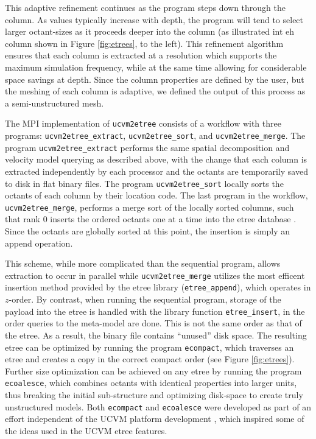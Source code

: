 This adaptive refinement continues as the program steps down through the column. As \vs{} values typically increase with depth, the program will tend to select larger octant-sizes as it proceeds deeper into the column (as illustrated int eh column shown in Figure \ref{fig:etrees}, to the left). This refinement algorithm ensures that each column is extracted at a resolution which supports the maximum simulation frequency, while at the same time allowing for considerable space savings at depth. Since the column properties are defined by the user, but the meshing of each column is adaptive, we defined the output of this process as a semi-unstructured mesh.

The MPI implementation of \texttt{ucvm2etree} consists of a workflow with three programs: \texttt{ucvm2etree\_extract}, \texttt{ucvm2etree\_sort}, and \texttt{ucvm2etree\_merge}. The program \texttt{ucvm2etree\_extract} performs the same spatial decomposition and velocity model querying as described above, with the change that each column is extracted independently by each processor and the octants are temporarily saved to disk in flat binary files. The program \texttt{ucvm2etree\_sort} locally sorts the octants of each column by their location code. The last program in the workflow, \texttt{ucvm2etree\_merge}, performs a merge sort of the locally sorted columns, such that rank 0 inserts the ordered octants one at a time into the etree database \citep[in its natural $z$-order; see][]{Tu_2003_Tech}. Since the octants are globally sorted at this point, the insertion is simply an append operation. 

This scheme, while more complicated than the sequential program, allows extraction to occur in parallel while \texttt{ucvm2etree\_merge} utilizes the most efficent insertion method provided by the etree library (\texttt{etree\_append}), which operates in $z$-order. By contrast, when running the sequential program, storage of the payload into the etree is handled with the library function \texttt{etree\_insert}, in the order queries to the meta-model are done. This is not the same order as that of the etree. As a result, the binary file contains ``unused'' disk space. The resulting etree can be optimized by running the program \texttt{ecompact}, which traverses an etree and creates a copy in the correct compact order (see Figure \ref{fig:etrees}). Further size optimization can be achieved on any etree by running the program \texttt{ecoalesce}, which combines octants with identical properties into larger units, thus breaking the initial sub-structure and optimizing disk-space to create truly unstructured models. Both \texttt{ecompact} and \texttt{ecoalesce} were developed as part of an effort independent of the UCVM platform development \citep{Schlosser_2008_Proc}, which inspired some of the ideas used in the UCVM etree features.
